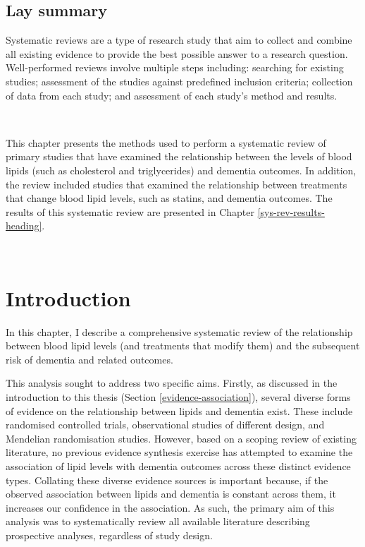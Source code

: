 \documentclass[a4paper, twoside]{templates/ociamthesis}
\begin{document}
\begin{laybox}

\hypertarget{lay-summary-2}{%
\section*{Lay summary}\label{lay-summary-2}}

Systematic reviews are a type of research study that aim to collect and combine all existing evidence to provide the best possible answer to a research question. Well-performed reviews involve multiple steps including: searching for existing studies; assessment of the studies against predefined inclusion criteria; collection of data from each study; and assessment of each study's method and results.

~

This chapter presents the methods used to perform a systematic review of primary studies that have examined the relationship between the levels of blood lipids (such as cholesterol and triglycerides) and dementia outcomes. In addition, the review included studies that examined the relationship between treatments that change blood lipid levels, such as statins, and dementia outcomes. The results of this systematic review are presented in Chapter \ref{sys-rev-results-heading}.

\end{laybox}

~

\hypertarget{sys-rev-intro}{%
\section{Introduction}\label{sys-rev-intro}}

In this chapter, I describe a comprehensive systematic review of the relationship between blood lipid levels (and treatments that modify them) and the subsequent risk of dementia and related outcomes.

This analysis sought to address two specific aims. Firstly, as discussed in the introduction to this thesis (Section \ref{evidence-association}), several diverse forms of evidence on the relationship between lipids and dementia exist. These include randomised controlled trials, observational studies of different design, and Mendelian randomisation studies. However, based on a scoping review of existing literature, no previous evidence synthesis exercise has attempted to examine the association of lipid levels with dementia outcomes across these distinct evidence types. Collating these diverse evidence sources is important because, if the observed association between lipids and dementia is constant across them, it increases our confidence in the association. As such, the primary aim of this analysis was to systematically review all available literature describing prospective analyses, regardless of study design.
\end{document}
